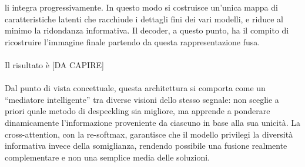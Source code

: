 li integra progressivamente. In questo modo si costruisce un’unica mappa di caratteristiche latenti che racchiude i dettagli fini dei vari modelli, 
e riduce al minimo la ridondanza informativa.
Il decoder, a questo punto, ha il compito di ricostruire l’immagine finale partendo da questa rappresentazione fusa. 
\\\\
Il risultato è [DA CAPIRE] 
\\\\
Dal punto di vista concettuale, questa architettura si comporta come un “mediatore intelligente” tra diverse visioni dello stesso segnale: non 
sceglie a priori quale metodo di despeckling sia migliore, ma apprende a ponderare dinamicamente l’informazione proveniente da ciascuno in base 
alla sua unicità. La cross-attention, con la re-softmax, garantisce che il modello privilegi la diversità informativa invece della somiglianza, 
rendendo possibile una fusione realmente complementare e non una semplice media delle soluzioni.
